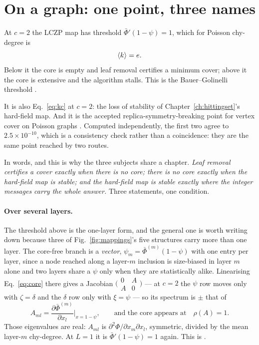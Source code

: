 \section{On a graph: one point, three names}
\label{sec:onepoint}

At $c=2$ the LCZP map has threshold $\bar\Phi'(1-\psi)=1$, which for
Poisson chy-degree is
\begin{equation}
  \langle k \rangle=e.
\end{equation}
Below it the core is empty and leaf removal certifies a minimum cover; above it
the core is extensive and the algorithm stalls. This is the Bauer--Golinelli
threshold \citep{bauer2001}.

It is also Eq.~\eqref{eq:kc} at $c=2$: the loss of stability of
Chapter~\ref{ch:hittingset}'s hard-field map. And it is the accepted
replica-symmetry-breaking point for vertex cover on Poisson graphs
\citep{weigt2000}. Computed independently, the first two agree to
$2.5\times10^{-10}$, which is a consistency check rather than a coincidence:
they are the same point reached by two routes.

In words, and this is why the three subjects share a chapter. \emph{Leaf removal certifies a
cover exactly when there is no core; there is no core exactly when the
hard-field map is stable; and the hard-field map is stable exactly where the
integer messages carry the whole answer.} Three statements, one condition.

\paragraph{Over several layers.} The threshold above is the one-layer form,
and the general one is worth writing down because three of
Fig.~\ref{fig:mappings}'s five structures carry more than one layer. The
core-free branch is a \emph{vector}, $\psi_{m}=\bar\Phi^{(m)}(1-\psi)$ with one
entry per layer, since a node reached along a layer-$m$ inclusion is
size-biased in layer $m$ alone and two layers share a $\psi$ only when they are
statistically alike. Linearising Eq.~\eqref{eq:core} there gives a Jacobian
$\bigl(\begin{smallmatrix}0&A\\A&0\end{smallmatrix}\bigr)$ --- at $c=2$ the
$\psi$ row moves only with $\zeta=\delta$ and the $\delta$ row only with
$\xi=\psi$ --- so its spectrum is $\pm$ that of
\begin{equation}
  A_{ml}=\frac{\partial\bar\Phi^{(m)}}{\partial x_{l}}\bigg|_{x=1-\psi},
  \qquad\text{and the core appears at}\quad \rho(A)=1.
  \label{eq:corethresh}
\end{equation}
Those eigenvalues are real: $A_{ml}$ is $\partial^{2}\Phi/\partial
x_{m}\partial x_{l}$, symmetric, divided by the mean layer-$m$ chy-degree. At
$L=1$ it is $\bar\Phi'(1-\psi)=1$ again. This is
.


